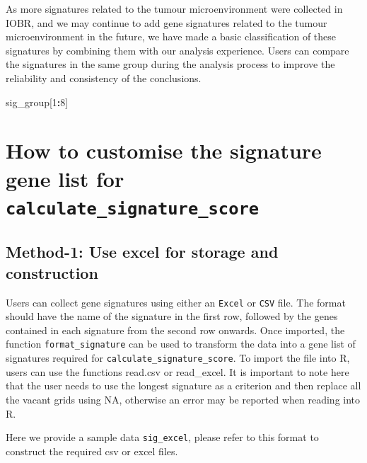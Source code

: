 \documentclass[
  12pt,
]{book}
\newenvironment{Shaded}{\begin{snugshade}}{\end{snugshade}}
\newcommand{\DecValTok}[1]{\textcolor[rgb]{0.00,0.00,0.81}{#1}}
\newcommand{\NormalTok}[1]{#1}
\newcommand{\SpecialCharTok}[1]{\textcolor[rgb]{0.81,0.36,0.00}{\textbf{#1}}}
\begin{document}
As more signatures related to the tumour microenvironment were collected in IOBR, and we may continue to add gene signatures related to the tumour microenvironment in the future, we have made a basic classification of these signatures by combining them with our analysis experience. Users can compare the signatures in the same group during the analysis process to improve the reliability and consistency of the conclusions.

\begin{Shaded}
\begin{Highlighting}[]
\NormalTok{sig\_group[}\DecValTok{1}\SpecialCharTok{:}\DecValTok{8}\NormalTok{]}
\end{Highlighting}
\end{Shaded}

\hypertarget{how-to-customise-the-signature-gene-list-for-calculate_signature_score}{%
\section{\texorpdfstring{How to customise the signature gene list for \texttt{calculate\_signature\_score}}{How to customise the signature gene list for calculate\_signature\_score}}\label{how-to-customise-the-signature-gene-list-for-calculate_signature_score}}

\hypertarget{method-1-use-excel-for-storage-and-construction}{%
\subsection{Method-1: Use excel for storage and construction}\label{method-1-use-excel-for-storage-and-construction}}

Users can collect gene signatures using either an \texttt{Excel} or \texttt{CSV} file. The format should have the name of the signature in the first row, followed by the genes contained in each signature from the second row onwards. Once imported, the function \texttt{format\_signature} can be used to transform the data into a gene list of signatures required for \texttt{calculate\_signature\_score}. To import the file into R, users can use the functions read.csv or read\_excel. It is important to note here that the user needs to use the longest signature as a criterion and then replace all the vacant grids using NA, otherwise an error may be reported when reading into R.

Here we provide a sample data \texttt{sig\_excel}, please refer to this format to construct the required csv or excel files.
\end{document}

